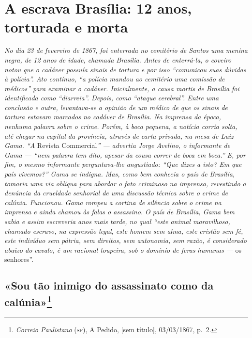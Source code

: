 \part{A escrava Brasília: 12 anos, torturada e morta}

\begin{argumento}
\emph{No dia 23 de fevereiro de 1867, foi enterrada no cemitério de
Santos uma menina negra, de 12 anos de idade, chamada Brasília. Antes de
enterrá-la, o coveiro notou que o cadáver possuía sinais de tortura e
por isso ``comunicou suas dúvidas à polícia''. Ato contínuo, ``a polícia
mandou ao cemitério uma comissão de médicos'' para examinar o cadáver.
Inicialmente, a \emph{causa mortis} de Brasília foi identificada como
``diarreia''. Depois, como ``ataque cerebral''. Entre uma conclusão e outra,
levantava-se a opinião de um médico de que os sinais de tortura estavam
marcados no cadáver de Brasília. Na imprensa da época, nenhuma palavra
sobre o crime. Porém, à boca pequena, a notícia corria solta, até chegar
na capital da província, através de carta privada, na mesa de Luiz Gama.
``A} Revista Commercial\emph{'' --- advertia Jorge Avelino, o informante de
Gama --- ``nem palavra tem dito, apesar da cousa correr de boca em boca.''
E, por fim, o mesmo informante perguntava-lhe angustiado: ``Que dizes a
isto? Em que país vivemos?'' Gama se indigna. Mas, como bem
conhecia o país de Brasília, tomaria uma via oblíqua para abordar o fato
criminoso na imprensa, revestindo a denúncia da crueldade senhorial de
uma discussão técnica sobre o crime de calúnia. Funcionou. Gama rompeu a
cortina de silêncio sobre o crime na imprensa e ainda chamou às falas o
assassino. O país de Brasília, Gama bem sabia e assim escreveria anos
mais tarde, no qual ``este animal maravilhoso, chamado escravo, na expressão
legal, este homem sem alma, este cristão sem fé, este indivíduo sem
pátria, sem direitos, sem autonomia, sem razão, é considerado abaixo do
cavalo, é um racional toupeira, sob o domínio de feras humanas ---} os
senhores''.
\end{argumento}

\chapter{«Sou tão inimigo do assassinato como da
calúnia»\footnote{\emph{Correio Paulistano} (\textsc{sp}), A Pedido,
  {[}sem título{]}, 03/03/1867, p.~2.}}

